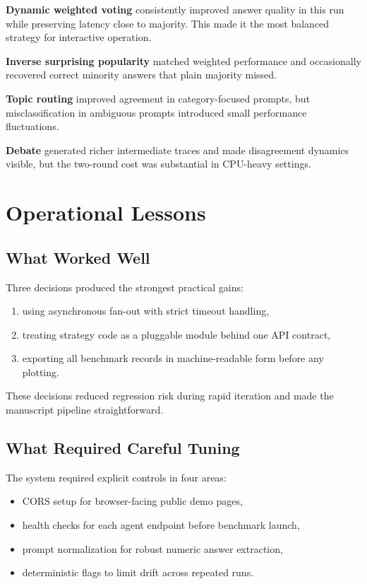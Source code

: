 \documentclass[conference]{IEEEtran}
\begin{document}
\textbf{Dynamic weighted voting} consistently improved answer quality in this run while preserving latency close to majority. This made it the most balanced strategy for interactive operation.

\textbf{Inverse surprising popularity} matched weighted performance and occasionally recovered correct minority answers that plain majority missed.

\textbf{Topic routing} improved agreement in category-focused prompts, but misclassification in ambiguous prompts introduced small performance fluctuations.

\textbf{Debate} generated richer intermediate traces and made disagreement dynamics visible, but the two-round cost was substantial in CPU-heavy settings.

\section{Operational Lessons}
\subsection{What Worked Well}
Three decisions produced the strongest practical gains:
\begin{enumerate}
  \item using asynchronous fan-out with strict timeout handling,
  \item treating strategy code as a pluggable module behind one API contract,
  \item exporting all benchmark records in machine-readable form before any plotting.
\end{enumerate}

These decisions reduced regression risk during rapid iteration and made the manuscript pipeline straightforward.

\subsection{What Required Careful Tuning}
The system required explicit controls in four areas:
\begin{itemize}
  \item CORS setup for browser-facing public demo pages,
  \item health checks for each agent endpoint before benchmark launch,
  \item prompt normalization for robust numeric answer extraction,
  \item deterministic flags to limit drift across repeated runs.
\end{itemize}
\end{document}
